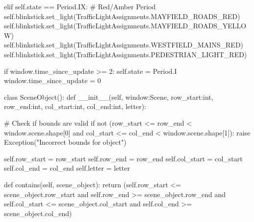 \documentclass[
  letterpaper,
  DIV=11,
  numbers=noendperiod]{scrartcl}
\newenvironment{Shaded}{\begin{snugshade}}{\end{snugshade}}
\newcommand{\BuiltInTok}[1]{\textcolor[rgb]{0.00,0.23,0.31}{#1}}
\newcommand{\CommentTok}[1]{\textcolor[rgb]{0.37,0.37,0.37}{#1}}
\newcommand{\ControlFlowTok}[1]{\textcolor[rgb]{0.00,0.23,0.31}{#1}}
\newcommand{\DecValTok}[1]{\textcolor[rgb]{0.68,0.00,0.00}{#1}}
\newcommand{\FunctionTok}[1]{\textcolor[rgb]{0.28,0.35,0.67}{#1}}
\newcommand{\KeywordTok}[1]{\textcolor[rgb]{0.00,0.23,0.31}{#1}}
\newcommand{\NormalTok}[1]{\textcolor[rgb]{0.00,0.23,0.31}{#1}}
\newcommand{\OperatorTok}[1]{\textcolor[rgb]{0.37,0.37,0.37}{#1}}
\newcommand{\PreprocessorTok}[1]{\textcolor[rgb]{0.68,0.00,0.00}{#1}}
\newcommand{\StringTok}[1]{\textcolor[rgb]{0.13,0.47,0.30}{#1}}
\newcommand{\VariableTok}[1]{\textcolor[rgb]{0.07,0.07,0.07}{#1}}
\begin{document}
\begin{Shaded}
\begin{Highlighting}[]
        \ControlFlowTok{elif} \VariableTok{self}\NormalTok{.state }\OperatorTok{==}\NormalTok{ Period.IX:}
            \CommentTok{\# Red/Amber Period}
            \VariableTok{self}\NormalTok{.blinkstick.set\_light(TrafficLightAssignments.MAYFIELD\_ROADS\_RED)}
            \VariableTok{self}\NormalTok{.blinkstick.set\_light(TrafficLightAssignments.MAYFIELD\_ROADS\_YELLOW)}
            \VariableTok{self}\NormalTok{.blinkstick.set\_light(TrafficLightAssignments.WESTFIELD\_MAINS\_RED)}
            \VariableTok{self}\NormalTok{.blinkstick.set\_light(TrafficLightAssignments.PEDESTRIAN\_LIGHT\_RED)}

            \ControlFlowTok{if}\NormalTok{ window.time\_since\_update }\OperatorTok{\textgreater{}=} \DecValTok{2}\NormalTok{:}
                \VariableTok{self}\NormalTok{.state }\OperatorTok{=}\NormalTok{ Period.I}
\NormalTok{                window.time\_since\_update }\OperatorTok{=} \DecValTok{0}

\KeywordTok{class}\NormalTok{ SceneObject():}
    \KeywordTok{def} \FunctionTok{\_\_init\_\_}\NormalTok{(}\VariableTok{self}\NormalTok{, window:Scene, row\_start:}\BuiltInTok{int}\NormalTok{, row\_end:}\BuiltInTok{int}\NormalTok{, col\_start:}\BuiltInTok{int}\NormalTok{, col\_end:}\BuiltInTok{int}\NormalTok{, letter):}
        
        \CommentTok{\# Check if bounds are valid}
        \ControlFlowTok{if} \KeywordTok{not}\NormalTok{ (row\_start }\OperatorTok{\textless{}=}\NormalTok{ row\_end }\OperatorTok{\textless{}}\NormalTok{ window.scene.shape[}\DecValTok{0}\NormalTok{] }\KeywordTok{and} 
\NormalTok{                col\_start }\OperatorTok{\textless{}=}\NormalTok{ col\_end }\OperatorTok{\textless{}}\NormalTok{ window.scene.shape[}\DecValTok{1}\NormalTok{]):}
            \ControlFlowTok{raise} \PreprocessorTok{Exception}\NormalTok{(}\StringTok{"Incorrect bounds for object"}\NormalTok{) }
        
        \VariableTok{self}\NormalTok{.row\_start }\OperatorTok{=}\NormalTok{ row\_start}
        \VariableTok{self}\NormalTok{.row\_end }\OperatorTok{=}\NormalTok{ row\_end}
        \VariableTok{self}\NormalTok{.col\_start }\OperatorTok{=}\NormalTok{ col\_start}
        \VariableTok{self}\NormalTok{.col\_end }\OperatorTok{=}\NormalTok{ col\_end}
        \VariableTok{self}\NormalTok{.letter }\OperatorTok{=}\NormalTok{ letter}

    \KeywordTok{def}\NormalTok{ contains(}\VariableTok{self}\NormalTok{, scene\_object):}
        \ControlFlowTok{return}\NormalTok{ (}\VariableTok{self}\NormalTok{.row\_start }\OperatorTok{\textless{}=}\NormalTok{ scene\_object.row\_start }\KeywordTok{and} 
                \VariableTok{self}\NormalTok{.row\_end }\OperatorTok{\textgreater{}=}\NormalTok{ scene\_object.row\_end }\KeywordTok{and} 
                \VariableTok{self}\NormalTok{.col\_start }\OperatorTok{\textless{}=}\NormalTok{ scene\_object.col\_start }\KeywordTok{and} 
                \VariableTok{self}\NormalTok{.col\_end }\OperatorTok{\textgreater{}=}\NormalTok{ scene\_object.col\_end)}
    

\end{Highlighting}
\end{Shaded}
\end{document}
